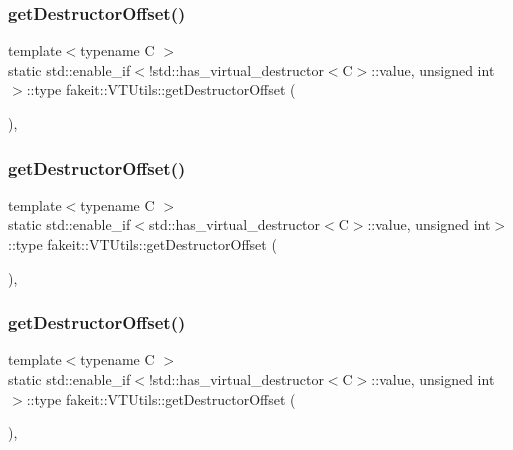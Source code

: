 \subsubsection{\texorpdfstring{getDestructorOffset()}{getDestructorOffset()}\hspace{0.1cm}{\footnotesize\ttfamily [2/18]}}
{\footnotesize\ttfamily template$<$typename C $>$ \\
static std\+::enable\+\_\+if$<$!std\+::has\+\_\+virtual\+\_\+destructor$<$C$>$\+::value, unsigned int$>$\+::type fakeit\+::\+V\+T\+Utils\+::get\+Destructor\+Offset (\begin{DoxyParamCaption}{ }\end{DoxyParamCaption})\hspace{0.3cm}{\ttfamily [inline]}, {\ttfamily [static]}}

\mbox{\label{classfakeit_1_1VTUtils_a9c71030f6040b59ec03cbe326ae1d654}} 
\subsubsection{\texorpdfstring{getDestructorOffset()}{getDestructorOffset()}\hspace{0.1cm}{\footnotesize\ttfamily [3/18]}}
{\footnotesize\ttfamily template$<$typename C $>$ \\
static std\+::enable\+\_\+if$<$std\+::has\+\_\+virtual\+\_\+destructor$<$C$>$\+::value, unsigned int$>$\+::type fakeit\+::\+V\+T\+Utils\+::get\+Destructor\+Offset (\begin{DoxyParamCaption}{ }\end{DoxyParamCaption})\hspace{0.3cm}{\ttfamily [inline]}, {\ttfamily [static]}}

\mbox{\label{classfakeit_1_1VTUtils_ac13eea89df8b1656a1bedb9a9bb5c518}} 
\subsubsection{\texorpdfstring{getDestructorOffset()}{getDestructorOffset()}\hspace{0.1cm}{\footnotesize\ttfamily [4/18]}}
{\footnotesize\ttfamily template$<$typename C $>$ \\
static std\+::enable\+\_\+if$<$!std\+::has\+\_\+virtual\+\_\+destructor$<$C$>$\+::value, unsigned int$>$\+::type fakeit\+::\+V\+T\+Utils\+::get\+Destructor\+Offset (\begin{DoxyParamCaption}{ }\end{DoxyParamCaption})\hspace{0.3cm}{\ttfamily [inline]}, {\ttfamily [static]}}

